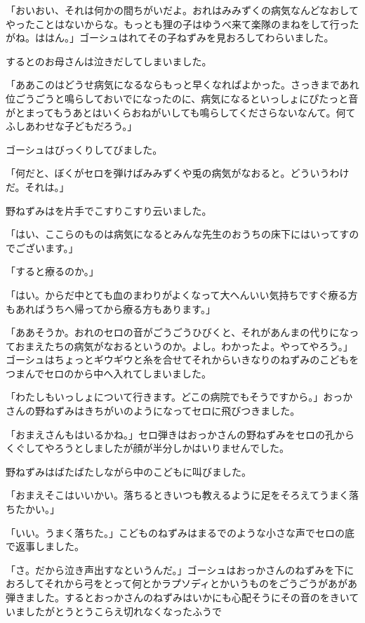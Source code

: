 \documentclass[uplatex,a5paper,twoside]{jsarticle}
\begin{document}
「おいおい、それは何かの間ちがいだよ。おれはみみずくの病気なんどなおしてやったことはないからな。もっとも狸の子はゆうべ来て楽隊のまねをして行ったがね。ははん。」ゴーシュはれてその子ねずみを見おろしてわらいました。

するとのお母さんは泣きだしてしまいました。

「ああこのはどうせ病気になるならもっと早くなればよかった。さっきまであれ位ごうごうと鳴らしておいでになったのに、病気になるといっしょにぴたっと音がとまってもうあとはいくらおねがいしても鳴らしてくださらないなんて。何てふしあわせな子どもだろう。」

ゴーシュはびっくりしてびました。

「何だと、ぼくがセロを弾けばみみずくや兎の病気がなおると。どういうわけだ。それは。」

野ねずみはを片手でこすりこすり云いました。

「はい、ここらのものは病気になるとみんな先生のおうちの床下にはいってすのでございます。」

「すると療るのか。」

「はい。からだ中とても血のまわりがよくなって大へんいい気持ちですぐ療る方もあればうちへ帰ってから療る方もあります。」

「ああそうか。おれのセロの音がごうごうひびくと、それがあんまの代りになっておまえたちの病気がなおるというのか。よし。わかったよ。やってやろう。」ゴーシュはちょっとギウギウと糸を合せてそれからいきなりのねずみのこどもをつまんでセロのから中へ入れてしまいました。

「わたしもいっしょについて行きます。どこの病院でもそうですから。」おっかさんの野ねずみはきちがいのようになってセロに飛びつきました。

「おまえさんもはいるかね。」セロ弾きはおっかさんの野ねずみをセロの孔からくぐしてやろうとしましたが顔が半分しかはいりませんでした。

野ねずみはばたばたしながら中のこどもに叫びました。

「おまえそこはいいかい。落ちるときいつも教えるように足をそろえてうまく落ちたかい。」

「いい。うまく落ちた。」こどものねずみはまるでのような小さな声でセロの底で返事しました。

「さ。だから泣き声出すなというんだ。」ゴーシュはおっかさんのねずみを下におろしてそれから弓をとって何とかラプソディとかいうものをごうごうがあがあ弾きました。するとおっかさんのねずみはいかにも心配そうにその音のをきいていましたがとうとうこらえ切れなくなったふうで
\end{document}
